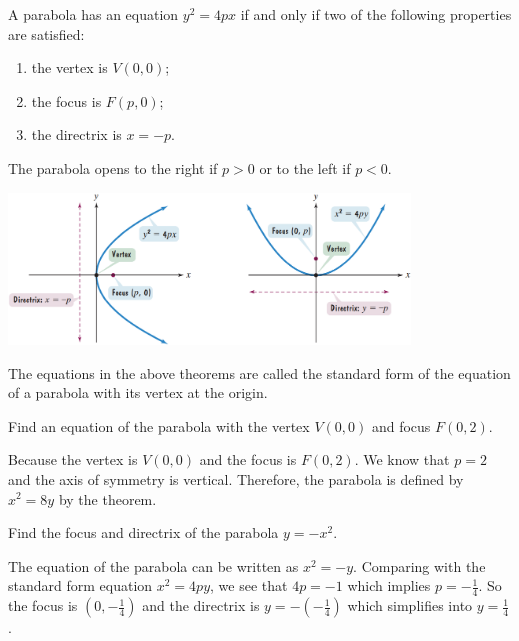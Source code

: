 \begin{theorem}
    A parabola has an equation $y^2=4px$ if and only if two of the following properties are satisfied:
    \begin{enumerate}[sepno]
        \item the vertex is $V(0, 0)$;
        \item the focus is $F(p, 0)$;
        \item the directrix is $x=-p$.
    \end{enumerate}

    The parabola opens to the right if $p>0$ or to the left if $p<0$.
\end{theorem}
\begin{center}
    \includegraphics[width=0.8\textwidth,keepaspectratio]{figs/ParabolaGraphs.png}
\end{center}
The equations in the above theorems are called the standard form of the equation of a parabola with its vertex at the origin.

\begin{example}
    Find an equation of the parabola with the vertex $V(0,0)$ and focus $F(0,2)$.
\end{example}
\begin{solution}
    Because the vertex is $V(0, 0)$ and the focus is $F(0, 2)$. We know that $p=2$ and the axis of symmetry is vertical. Therefore, the parabola is defined by $x^2=8y$ by the theorem.
\end{solution}

\begin{example}
    Find the focus and directrix of the parabola $y=-x^2$.
\end{example}
\begin{solution}
    The equation of the parabola can be written as $x^2=-y$. Comparing with the standard form equation $x^2=4py$, we see that $4p=-1$ which implies $p=-\frac14$. So the focus is $\left(0, -\frac14\right)$ and the directrix is $y=-\left(-\frac14\right)$ which simplifies into $y=\frac{1}{4}$.
\end{solution}

